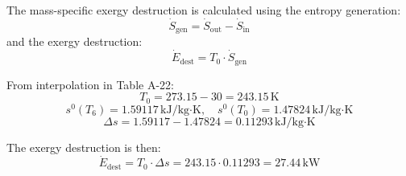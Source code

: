The mass-specific exergy destruction is calculated using the entropy generation:  
\[
\dot{S}_{\text{gen}} = \dot{S}_{\text{out}} - \dot{S}_{\text{in}}
\]  
and the exergy destruction:  
\[
\dot{E}_{\text{dest}} = T_0 \cdot \dot{S}_{\text{gen}}
\]  

From interpolation in Table A-22:  
\[
T_0 = 273.15 - 30 = 243.15 \, \text{K}
\]  
\[
s^0(T_6) = 1.59117 \, \text{kJ/kg·K}, \quad s^0(T_0) = 1.47824 \, \text{kJ/kg·K}
\]  
\[
\Delta s = 1.59117 - 1.47824 = 0.11293 \, \text{kJ/kg·K}
\]  

The exergy destruction is then:  
\[
\dot{E}_{\text{dest}} = T_0 \cdot \Delta s = 243.15 \cdot 0.11293 = 27.44 \, \text{kW}
\]